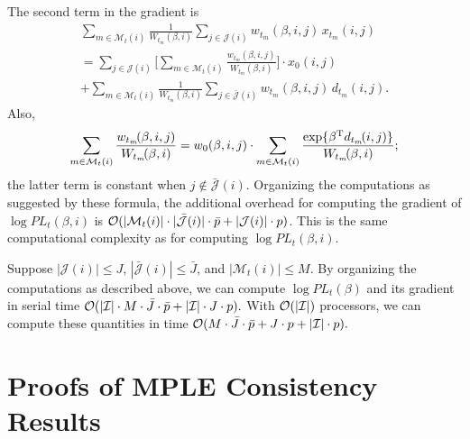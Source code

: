 \documentclass[aoas,preprint]{imsart}
\begin{document}
The second term in the gradient is
\begin{multline*}
    \sum_{m \in \mathcal{M}_t(i)}
        \frac{1}{W_{t_m}\!(\beta,i)}
        \sum_{j \in \mathcal{J}(i)}
            w_{t_m}\!(\beta,i,j)
            \,
            x_{t_m}\!(i,j) \\
    =
    \sum_{j \in \mathcal{J}(i)}
    \bigg[
        \sum_{m \in \mathcal{M}_t(i)}
            \frac{w_{t_m}\!(\beta,i,j)}{W_{t_m}\!(\beta,i)}
    \bigg]
    \cdot
    x_0(i,j) \\
    +
    \sum_{m \in \mathcal{M}_t(i)}
        \frac{1}{W_{t_m}\!(\beta,i)}
        \sum_{j \in \mathcal{\bar J}(i)}
            w_{t_m}\!(\beta,i,j)
            \,
            d_{t_m}\!(i,j).
\end{multline*}
Also,
\[
    \sum_{m \in \mathcal{M}_t(i)}
        \frac{w_{t_m}\!(\beta,i,j)}{W_{t_m}\!(\beta,i)}
    =
        w_{0}(\beta,i,j)
        \cdot
        \sum_{m \in \mathcal{M}_t(i)}
            \frac{
                \exp\{\beta^{\mathrm{T}} d_{t_m}\!(i,j) \}
            }{
                W_{t_m}\!(\beta,i)
            };
\]
the latter term is constant when $j \notin \mathcal{\bar J}(i)$.
Organizing the computations as suggested by these formula,
the additional overhead for computing the gradient of
$\log \mathit{PL}_t(\beta,i)$ is
\(
    \mathcal{O}(
        |\mathcal{M}_t(i)| \cdot |\mathcal{\bar J}(i)| \cdot \bar p
        +
        |\mathcal{J}(i)| \cdot p
    )
\).
This is the same computational complexity as for computing
$\log \mathit{PL}_t(\beta,i)$.


Suppose $|\mathcal{J}(i)| \leq J$, $|\mathcal{\bar J}(i)| \leq \bar J$,
and $|\mathcal{M}_t(i)| \leq M$.  By organizing the computations as described
above, we can compute $\log \mathit{PL}_t(\beta)$ and its gradient in serial
time
\(
    \mathcal{O}(
        | \mathcal{I} |
        \cdot
        M
        \cdot
        \bar J
        \cdot
        \bar p
        +
        |\mathcal{I}| \cdot J \cdot p
    ).
\)
With $\mathcal{O}(|\mathcal{I}|)$ processors, we can compute these quantities in time
\(
    \mathcal{O}(
        M \cdot \bar J \cdot \bar p
        +
        J \cdot p
        +
        |\mathcal{I}| \cdot p
    ).
\)


\section{Proofs of MPLE Consistency Results}\label{S:MPLE-consistency-proofs}
\end{document}
